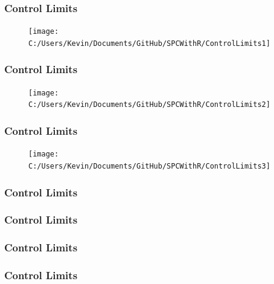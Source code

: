 \documentclass{beamer}
\begin{document}
\begin{frame}
\frametitle{Control Limits}
\begin{figure}
\centering
\texttt{[image: C:/Users/Kevin/Documents/GitHub/SPCWithR/ControlLimits1]}
\end{figure}

\end{frame}
\begin{frame}
	\frametitle{Control Limits}
	\begin{figure}
		\centering
		\texttt{[image: C:/Users/Kevin/Documents/GitHub/SPCWithR/ControlLimits2]}
	\end{figure}
	
\end{frame}
\begin{frame}
	\frametitle{Control Limits}
	\begin{figure}
		\centering
		\texttt{[image: C:/Users/Kevin/Documents/GitHub/SPCWithR/ControlLimits3]}
	\end{figure}
	
\end{frame}

\begin{frame}
	\frametitle{Control Limits}
	
\end{frame}

\begin{frame}
	\frametitle{Control Limits}
	
\end{frame}

\begin{frame}
	\frametitle{Control Limits}
	
\end{frame}

\begin{frame}
	\frametitle{Control Limits}
	
\end{frame}
\end{document}
